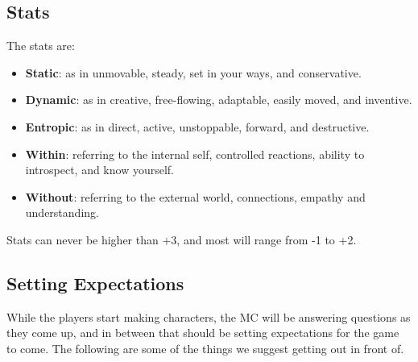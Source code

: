 \documentclass[
  oneside,
  statementpaper,
  9pt]{memoir}
\begin{document}
\hypertarget{stats-10}{%
\subsection{Stats}\label{stats-10}}

The stats are:

\begin{itemize}
\tightlist
\item
  \textbf{Static}: as in unmovable, steady, set in your ways, and
  conservative.
\item
  \textbf{Dynamic}: as in creative, free-flowing, adaptable, easily
  moved, and inventive.
\item
  \textbf{Entropic}: as in direct, active, unstoppable, forward, and
  destructive.
\item
  \textbf{Within}: referring to the internal self, controlled reactions,
  ability to introspect, and know yourself.
\item
  \textbf{Without}: referring to the external world, connections,
  empathy and understanding.
\end{itemize}

Stats can never be higher than +3, and most will range from -1 to +2.

\hypertarget{setting-expectations}{%
\subsection{Setting Expectations}\label{setting-expectations}}

While the players start making characters, the MC will be answering
questions as they come up, and in between that should be setting
expectations for the game to come. The following are some of the things
we suggest getting out in front of.
\end{document}
